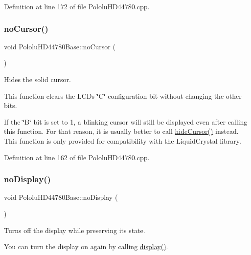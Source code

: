 Definition at line 172 of file Pololu\+H\+D44780.\+cpp.

\mbox{\label{class_pololu_h_d44780_base_ab40886cf0b563a1806bc9391d00b032d}} 
\subsubsection{\texorpdfstring{no\+Cursor()}{noCursor()}}
{\footnotesize\ttfamily void Pololu\+H\+D44780\+Base\+::no\+Cursor (\begin{DoxyParamCaption}{ }\end{DoxyParamCaption})}

Hides the solid cursor.

This function clears the L\+CD\textquotesingle{}s \char`\"{}\+C\char`\"{} configuration bit without changing the other bits.

If the \char`\"{}\+B\char`\"{} bit is set to 1, a blinking cursor will still be displayed even after calling this function. For that reason, it is usually better to call \hyperlink{class_pololu_h_d44780_base_a1db083d254d251c479a577f29bcdcec8}{hide\+Cursor()} instead. This function is only provided for compatibility with the Liquid\+Crystal library. 

Definition at line 162 of file Pololu\+H\+D44780.\+cpp.

\mbox{\label{class_pololu_h_d44780_base_abc2d4e126017565c2a0cf2aac67870a0}} 
\subsubsection{\texorpdfstring{no\+Display()}{noDisplay()}}
{\footnotesize\ttfamily void Pololu\+H\+D44780\+Base\+::no\+Display (\begin{DoxyParamCaption}{ }\end{DoxyParamCaption})}

Turns off the display while preserving its state.

You can turn the display on again by calling \hyperlink{class_pololu_h_d44780_base_af5dd1e137bfe9310a418924b7483fcdf}{display()}. 

